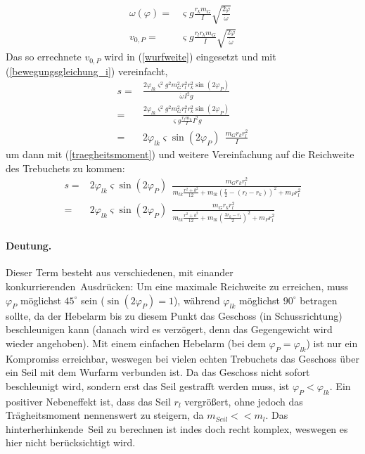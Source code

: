 \begin{align}
\omega(\varphi)=&\varsigma g\frac{ r_k m_G}{I}\sqrt{\frac{2\varphi}{\dot\omega}}\\
v_{0,P}=&\varsigma g\frac{ r_l r_k m_G}{I}\sqrt{\frac{2\varphi}{\dot\omega}}
\end{align}
Das so errechnete $v_{0,P}$ wird in (\ref{wurfweite}) eingesetzt und mit (\ref{bewegungsgleichung_i}) vereinfacht,
\begin{align}
\nonumber
s =& \frac{2 \varphi_{lk} \varsigma^2 g^2 m_G^2 r_l^2 r_k^2 \sin{(2\varphi_P)}}{\dot\omega I^2 g}\\\nonumber
  =& \frac{2 \varphi_{lk} \varsigma^2 g^2 m_G^2 r_l^2 r_k^2 \sin{(2\varphi_P)}}{\varsigma g\frac{r_l m_k}{I} I^2 g}\\
  =&  2\varphi_{lk}\varsigma\sin{(2\varphi_P)} \ \  \frac{m_G r_k r_l^2 }{I}
\end{align}
um dann mit (\ref{traegheitsmoment}) und weitere Vereinfachung auf die Reichweite des Trebuchets zu kommen:
\begin{align}
\nonumber
s =& 2\varphi_{lk} \varsigma \sin{(2\varphi_P)} \ \ \frac{ m_G  r_kr_l^2 }
		{m_{lk} \frac{r^2+b^2}{12} + m_{lk} (\frac{r}{2}-(r_l-r_k))^2+m_P r_l^2}\\
		\label{reichweite}
  =& 2 \varphi_{lk} \varsigma \sin{(2\varphi_P)} \ \ \frac{ m_G  r_kr_l^2}
		{m_{lk} \frac{r^2+b^2}{12} + m_{lk} (\frac{3r_k-r_l}{2})^2+m_P r_l^2}
\end{align}

\paragraph{Deutung.}
Dieser Term besteht aus verschiedenen, mit einander \glqq konkurrierenden\grqq \ Ausdrücken: Um eine maximale Reichweite zu erreichen, muss $\varphi_P$ möglichst $45^\circ$ sein ($\sin{(2\varphi_P)}=1$), während $\varphi_{lk}$ möglichst $90^\circ$ betragen sollte, da der Hebelarm bis zu diesem Punkt das Geschoss (in Schussrichtung) beschleunigen kann (danach wird es verzögert, denn das Gegengewicht wird wieder angehoben). Mit einem einfachen Hebelarm (bei dem $\varphi_P=\varphi_{lk}$) ist nur ein Kompromiss erreichbar, weswegen bei vielen echten Trebuchets das Geschoss über ein Seil mit dem Wurfarm verbunden ist. Da das Geschoss nicht sofort beschleunigt wird, sondern erst das Seil gestrafft werden muss, ist $\varphi_P<\varphi_{lk}$. Ein positiver Nebeneffekt ist, dass das Seil $r_l$ vergrößert, ohne jedoch das Trägheitsmoment nennenswert zu steigern, da $m_{Seil}<<m_l$. Das \glqq hinterherhinkende\grqq \ Seil zu berechnen ist indes doch recht komplex, weswegen es hier nicht berücksichtigt wird.

